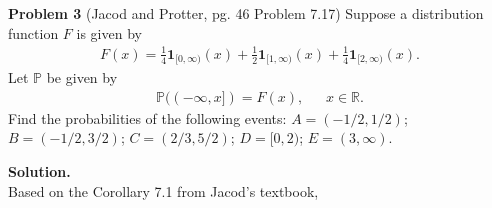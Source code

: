 \documentclass{article}
\begin{document}
 \setcounter{page}{4}
\vspace{3 mm}

\noindent \textbf{Problem 3} (Jacod and Protter, pg. 46 Problem 7.17) Suppose a distribution function $F$ is given by
\begin{eqnarray*} F(x) = \frac{1}{4}\mathbf{1}_{[0, \infty)}(x) + \frac{1}{2}\mathbf{1}_{[1,\infty)}(x) + \frac{1}{4}\mathbf{1}_{[2,\infty)}(x). \end{eqnarray*}  Let $\mathbb{P}$ be given by
		\begin{eqnarray*} \mathbb{P}((-\infty, x]) = F(x), ~~~~~~~ x \in \mathbb{R}. \end{eqnarray*}  Find the probabilities of the following events:  $A = (-1/2, 1/2)$; $B = (-1/2, 3/2)$; $C = (2/3, 5/2)$; $D = [0,2)$; $E = (3,\infty)$.

\vspace{2 mm}
\noindent \textbf{Solution.}\\
Based on the Corollary 7.1 from Jacod\rq s textbook, 
\end{document}
